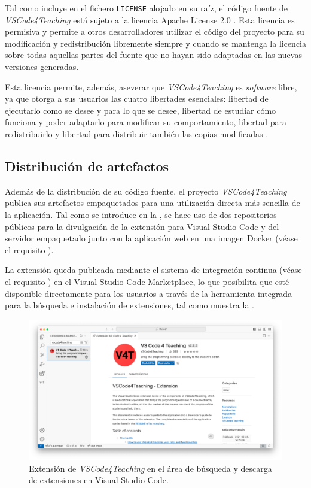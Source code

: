 Tal como incluye en el fichero \texttt{LICENSE} alojado en su raíz, el código fuente de \textit{VSCode4Teaching} está sujeto a la licencia Apache License 2.0 \cite{ApacheLicense}. Esta licencia es permisiva y permite a otros desarrolladores utilizar el código del proyecto para su modificación y redistribución libremente siempre y cuando se mantenga la licencia sobre todas aquellas partes del fuente que no hayan sido adaptadas en las nuevas versiones generadas.

Esta licencia permite, además, aseverar que \textit{VSCode4Teaching} es \textit{software} libre, ya que otorga a sus usuarios las cuatro libertades esenciales: libertad de ejecutarlo como se desee y para lo que se desee, libertad de estudiar cómo funciona y poder adaptarlo para modificar su comportamiento, libertad para redistribuirlo y libertad para distribuir también las copias modificadas \cite{FreeSoftwareFreedoms}.

\subsection{Distribución de artefactos}
\label{subsec:distribArtefactos}
Además de la distribución de su código fuente, el proyecto \textit{VSCode4Teaching} publica sus artefactos empaquetados para una utilización directa más sencilla de la aplicación. Tal como se introduce en la , se hace uso de dos repositorios públicos para la divulgación de la extensión para Visual Studio Code y del servidor empaquetado junto con la aplicación web en una imagen Docker (véase el requisito ).

La extensión queda publicada mediante el sistema de integración continua (véase el requisito ) en el Visual Studio Code Marketplace, lo que posibilita que esté disponible directamente para los usuarios a través de la herramienta integrada para la búsqueda e instalación de extensiones, tal como muestra la .
\begin{figure}[ht]
    \centering
    \includegraphics[width=0.8\linewidth]{imagenes/utilizadas/4-5-distribucion/vscodeMarketplace.png}
    \caption{Extensión de \textit{VSCode4Teaching} en el área de búsqueda y descarga de extensiones en Visual Studio Code.}
    \label{fig:distribVSCodeMarketplace}
\end{figure}

